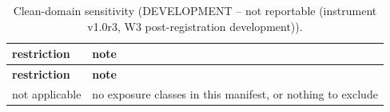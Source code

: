 \begingroup\footnotesize
\begin{longtable}{>{\raggedright\arraybackslash}p{126.4pt}>{\raggedright\arraybackslash}p{304.6pt}}
\caption{Clean-domain sensitivity (DEVELOPMENT -- not reportable (instrument v1.0r3, W3 post-registration development)).} \\
\toprule
\textbf{restriction} & \textbf{note} \\
\midrule
\endfirsthead
\toprule
\textbf{restriction} & \textbf{note} \\
\midrule
\endhead
\bottomrule
\endfoot
not applicable & no exposure classes in this manifest, or nothing to exclude \\
\end{longtable}
\endgroup

